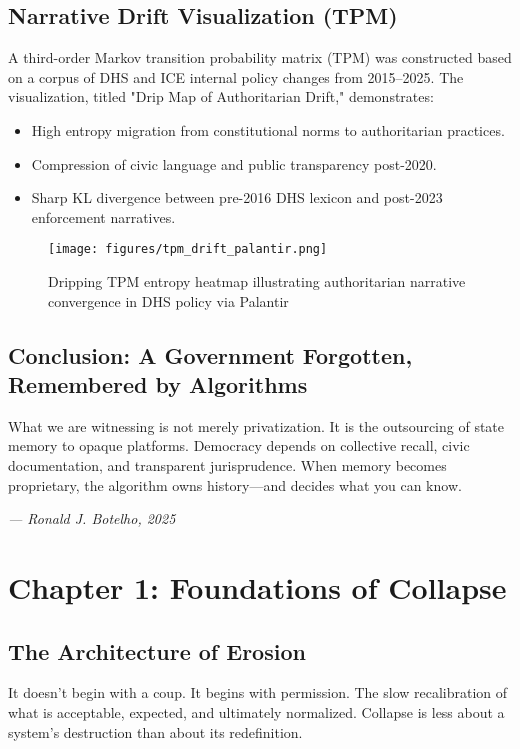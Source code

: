 \section{Narrative Drift Visualization (TPM)}
A third-order Markov transition probability matrix (TPM) was constructed based on a corpus of DHS and ICE internal policy changes from 2015–2025. The visualization, titled "Drip Map of Authoritarian Drift," demonstrates:

\begin{itemize}
  \item High entropy migration from constitutional norms to authoritarian practices.
  \item Compression of civic language and public transparency post-2020.
  \item Sharp KL divergence between pre-2016 DHS lexicon and post-2023 enforcement narratives.
\end{itemize}

\begin{figure}[h!]
  \centering
  \texttt{[image: figures/tpm\_drift\_palantir.png]}
  \caption{Dripping TPM entropy heatmap illustrating authoritarian narrative convergence in DHS policy via Palantir}
\end{figure}

\section*{Conclusion: A Government Forgotten, Remembered by Algorithms}
What we are witnessing is not merely privatization. It is the outsourcing of state memory to opaque platforms. Democracy depends on collective recall, civic documentation, and transparent jurisprudence. When memory becomes proprietary, the algorithm owns history—and decides what you can know.

\begin{flushright}
\textit{--- Ronald J. Botelho, 2025}
\end{flushright}

\newpage

\chapter{Chapter 1: Foundations of Collapse}
\section*{The Architecture of Erosion}
It doesn’t begin with a coup. It begins with permission. The slow recalibration of what is acceptable, expected, and ultimately normalized. Collapse is less about a system’s destruction than about its redefinition.

